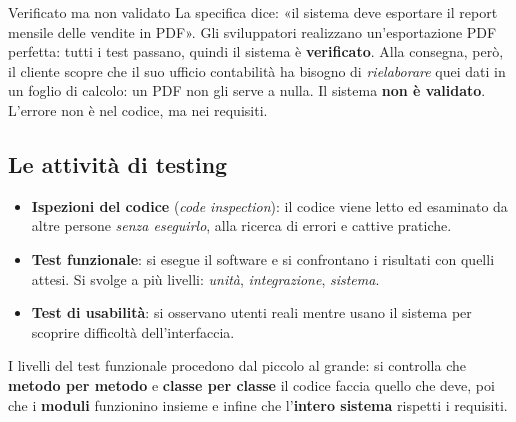 \begin{esempio}{Verificato ma non validato}
La specifica dice: «il sistema deve esportare il report mensile delle vendite in PDF». Gli sviluppatori realizzano un'esportazione
PDF perfetta: tutti i test passano, quindi il sistema è \textbf{verificato}. Alla consegna, però, il cliente scopre che il suo
ufficio contabilità ha bisogno di \textit{rielaborare} quei dati in un foglio di calcolo: un PDF non gli serve a nulla.
Il sistema \textbf{non è validato}. L'errore non è nel codice, ma nei requisiti.
\end{esempio}

\subsection{Le attività di testing}

\begin{itemize}
  \item \textbf{Ispezioni del codice} (\textit{code inspection}): il codice viene letto ed esaminato da altre persone \textit{senza eseguirlo},
        alla ricerca di errori e cattive pratiche.
  \item \textbf{Test funzionale}: si esegue il software e si confrontano i risultati con quelli attesi. Si svolge a più livelli:
        \textit{unità}, \textit{integrazione}, \textit{sistema}.
  \item \textbf{Test di usabilità}: si osservano utenti reali mentre usano il sistema per scoprire difficoltà dell'interfaccia.
\end{itemize}

I livelli del test funzionale procedono dal piccolo al grande: si controlla che \textbf{metodo per metodo} e \textbf{classe per classe}
il codice faccia quello che deve, poi che i \textbf{moduli} funzionino insieme e infine che l'\textbf{intero sistema} rispetti i requisiti.

